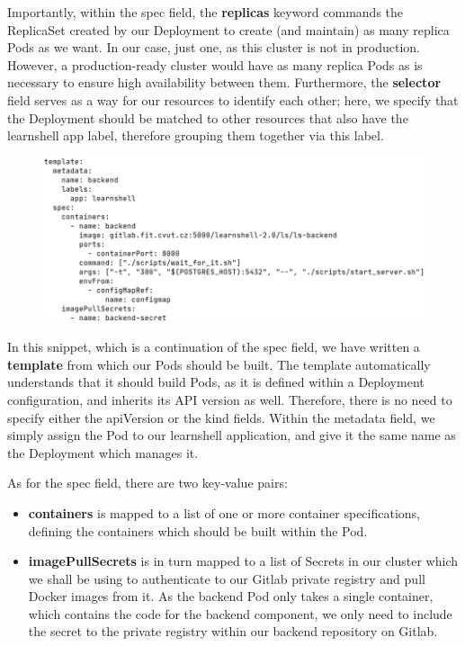 \documentclass[thesis=B,english]{FITthesis}[2019/12/23]
\begin{document}
Importantly, within the spec field, the \textbf{replicas} keyword commands the ReplicaSet created by our Deployment to create (and maintain) as many replica Pods as we want. In our case, just one, as this cluster is not in production. However, a production-ready cluster would have as many replica Pods as is necessary to ensure high availability between them. Furthermore, the \textbf{selector} field serves as a way for our resources to identify each other; here, we specify that the Deployment should be matched to other resources that also have the learnshell app label, therefore grouping them together via this label.

\begin{figure}[H]
\centering
\hspace*{-0.5cm}
\includegraphics[scale=0.5]{deploy-backend2}
\end{figure}

In this snippet, which is a continuation of the spec field, we have written a \textbf{template} from which our Pods should be built. The template automatically understands that it should build Pods, as it is defined within a Deployment configuration, and inherits its API version as well. Therefore, there is no need to specify either the apiVersion or the kind fields. Within the metadata field, we simply assign the Pod to our learnshell application, and give it the same name as the Deployment which manages it.

As for the spec field, there are two key-value pairs: 

\begin{itemize}
  \setlength\itemsep{0em}
  \item \textbf{containers} is mapped to a list of one or more container specifications, defining the containers which should be built within the Pod.
  \item \textbf{imagePullSecrets} is in turn mapped to a list of Secrets in our cluster which we shall be using to authenticate to our Gitlab private registry and pull Docker images from it. As the backend Pod only takes a single container, which contains the code for the backend component, we only need to include the secret to the private registry within our backend repository on Gitlab.
\end{itemize}
\end{document}
